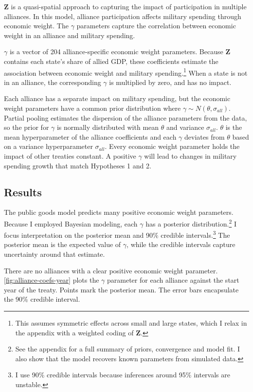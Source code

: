 \documentclass[12pt]{article}
\begin{document}
$\textbf{Z}$ is a quasi-spatial approach to capturing the impact of participation in multiple alliances.
In this model, alliance participation affects military spending through economic weight.  
The $\gamma$ parameters capture the correlation between economic weight in an alliance and military spending. 


$\gamma$ is a vector of 204 alliance-specific economic weight parameters.  
Because \textbf{Z} contains each state's share of allied GDP, these coefficients estimate the association between economic weight and military spending.\footnote{This assumes symmetric effects across small and large states, which I relax in the appendix with a weighted coding of $\textbf{Z}$.} 
When a state is not in an alliance, the corresponding $\gamma$ is multiplied by zero, and has no impact. 


Each alliance has a separate impact on military spending, but the economic weight parameters have a common prior distribution where $\gamma \sim N(\theta, \sigma_{all})$.
Partial pooling estimates the dispersion of the alliance parameters from the data, so the prior for $\gamma$ is normally distributed with mean $\theta$ and variance $\sigma_{all}$. 
$\theta$ is the mean hyperparameter of the alliance coefficients and each $\gamma$ deviates from $\theta$ based on a variance hyperparameter $\sigma_{all}$.
Every economic weight parameter holds the impact of other treaties constant. 
A positive $\gamma$ will lead to changes in military spending growth that match Hypotheses 1 and 2. 
    


\subsection{Results} 


The public goods model predicts many positive economic weight parameters. 
Because I employed Bayesian modeling, each $\gamma$ has a posterior distribution.\footnote{See the appendix for a full summary of priors, convergence and model fit. I also show that the model recovers known parameters from simulated data.} 
I focus interpretation on the posterior mean and 90\% credible intervals.\footnote{I use 90\% credible intervals because inferences around 95\% intervals are unstable.}
The posterior mean is the expected value of $\gamma$, while the credible intervals capture uncertainty around that estimate.  


There are no alliances with a clear positive economic weight parameter.
\autoref{fig:alliance-coefs-year} plots the $\gamma$ parameter for each alliance against the start year of the treaty.
Points mark the posterior mean. 
The error bars encapsulate the 90\% credible interval.
\end{document}
